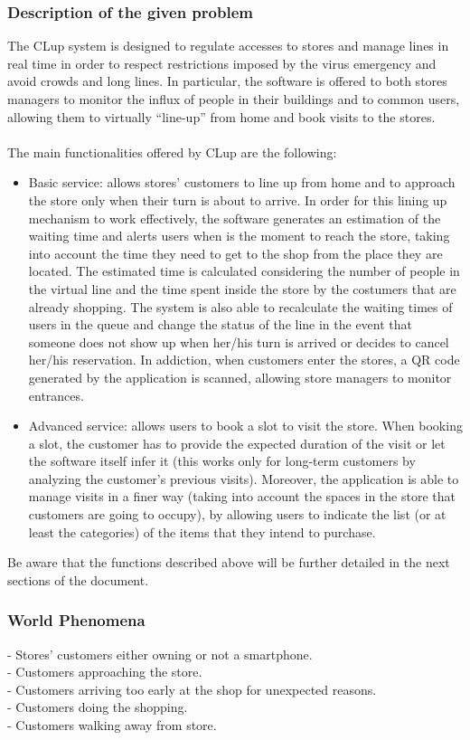 \documentclass{article}
\begin{document}
\subsubsection{Description of the given problem}
The CLup system is designed to regulate accesses to stores and manage lines in real time in order to respect restrictions imposed by the virus emergency and avoid crowds and long lines. In particular, the software is offered to both stores managers to monitor the influx of people in their buildings and to common users, allowing them to virtually “line-up” from home and book visits to the stores.\\
\smallskip\\
The main functionalities offered by CLup are the following:\\
\begin{itemize}
\item Basic service: allows stores' customers to line up from home and to approach the store only when their turn is about to arrive. In order for this lining up mechanism to work effectively, the software generates an estimation of the waiting time and alerts users when is the moment to reach the store, taking into account the time they need to get to the shop from the place they are located. The estimated time is calculated considering the number of people in the virtual line and the time spent inside the store by the costumers that are already shopping. The system is also able to recalculate the waiting times of users in the queue and change the status of the line in the event that someone does not show up when her/his turn is arrived or decides to cancel her/his reservation. In addiction, when customers enter the stores, a QR code generated by the application is scanned, allowing store managers to monitor entrances.
\item Advanced service: allows users to book a slot to visit the store. When booking a slot, the customer has to provide the expected duration of the visit or let the software itself infer it (this works only for long-term customers by analyzing the customer’s previous visits). Moreover, the application is able to manage visits in a finer way (taking into account the spaces in the store that customers are going to occupy), by allowing users to indicate the list (or at least the categories) of the items that they intend to purchase.
\end{itemize}
Be aware that the functions described above will be further detailed in the next sections of the document.
\subsubsection{World Phenomena}
\noindent\medskip
[WP1] - Stores’ customers either owning or not a smartphone.\\
\noindent\medskip
[WP2] - Customers approaching the store.\\
\noindent\medskip
[WP3] - Customers arriving too early at the shop for unexpected reasons.\\
\noindent\medskip
[WP4] - Customers doing the shopping.\\
\noindent\medskip
[WP5] - Customers walking away from store.
\end{document}
